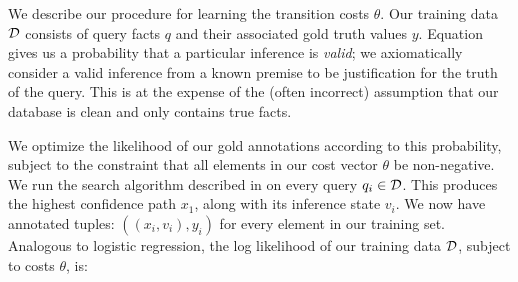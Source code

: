 We describe our procedure for learning the transition costs $\theta$.
Our training data $\mathcal{D}$ consists of query facts $q$ and their associated
  gold truth values $y$.
Equation  gives us a probability that a particular inference
  is \textit{valid}; we axiomatically consider a valid inference from
  a known premise to be justification for the truth of the query.
This is at the expense of the (often incorrect) assumption that our 
  database is clean and only contains true facts.

We optimize the likelihood of our gold annotations according to
  this probability, subject to
  the constraint that all elements in our cost vector $\theta$ be
  non-negative.
We run the search algorithm described in  on every
  query $q_i \in \mathcal{D}$.
This produces the highest confidence path $x_1$, along with its
  inference state $v_i$.
We now have annotated tuples: $( (x_i, v_i), y_i )$ for every
  element in our training set.
Analogous to logistic regression, the log likelihood of our training
  data $\mathcal{D}$, subject to costs $\theta$, is:

%

